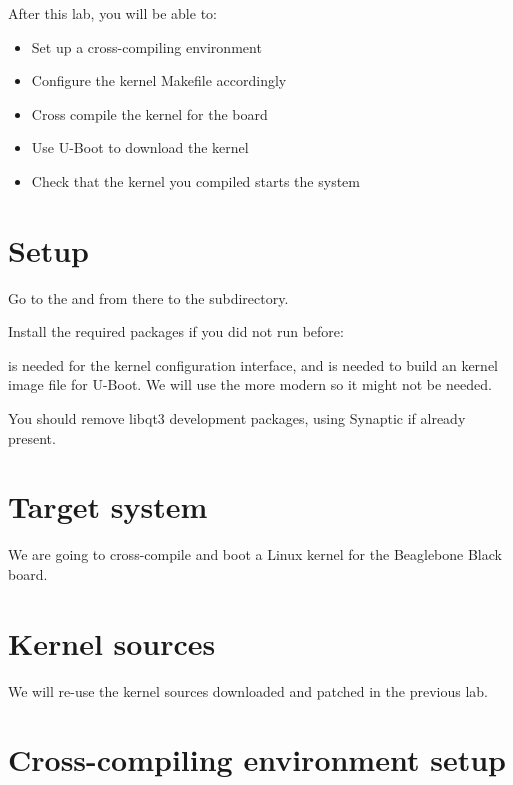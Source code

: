 
After this lab, you will be able to:
\begin{itemize}
\item Set up a cross-compiling environment
\item Configure the kernel Makefile accordingly
\item Cross compile the kernel for the \devboard board
\item Use U-Boot to download the kernel
\item Check that the kernel you compiled starts the system
\end{itemize}

\section{Setup}

Go to the \labdir and from there to the  subdirectory.

Install the required packages if you did not run  before:


 is needed for the  kernel configuration interface, and 
is needed to build an  kernel image file for U-Boot. We will use the more modern 
so it might not be needed.

You should remove libqt3 development packages, using Synaptic if already present.

\section{Target system}

We are going to cross-compile and boot a Linux kernel for the Beaglebone Black
board.

\section{Kernel sources}

We will re-use the kernel sources downloaded and patched in the
previous lab.

\clearpage
\section{Cross-compiling environment setup}

